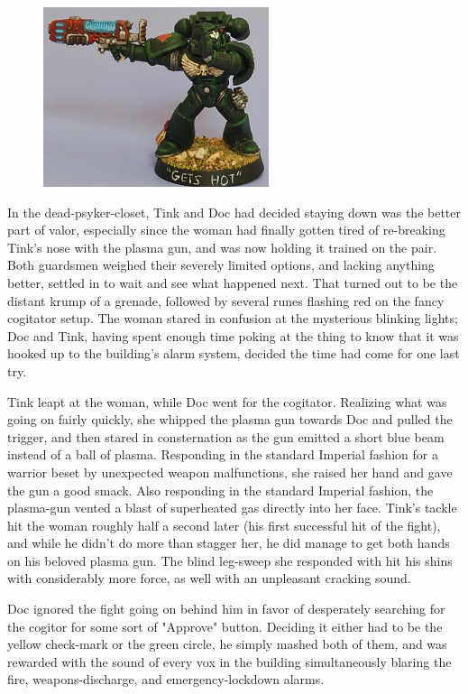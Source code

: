 \begin{figure}
	\begin{center}
		\includegraphics[width=\figwidth]{pics/21/93.png}
	\end{center}
\end{figure}
In the dead-psyker-closet, Tink and Doc had decided staying down was the better part of valor, especially since the woman had finally gotten tired of re-breaking Tink's nose with the plasma gun, and was now holding it trained on the pair. 
Both guardsmen weighed their severely limited options, and lacking anything better, settled in to wait and see what happened next. 
That turned out to be the distant krump of a grenade, followed by several runes flashing red on the fancy cogitator setup. 
The woman stared in confusion at the mysterious blinking lights; 
Doc and Tink, having spent enough time poking at the thing to know that it was hooked up to the building's alarm system, decided the time had come for one last try.

Tink leapt at the woman, while Doc went for the cogitator. 
Realizing what was going on fairly quickly, she whipped the plasma gun towards Doc and pulled the trigger, and then stared in consternation as the gun emitted a short blue beam instead of a ball of plasma. 
Responding in the standard Imperial fashion for a warrior beset by unexpected weapon malfunctions, she raised her hand and gave the gun a good smack. 
Also responding in the standard Imperial fashion, the plasma-gun vented a blast of superheated gas directly into her face. 
Tink's tackle hit the woman roughly half a second later (his first successful hit of the fight), and while he didn't do more than stagger her, he did manage to get both hands on his beloved plasma gun. 
The blind leg-sweep she responded with hit his shins with considerably more force, as well with an unpleasant cracking sound.

Doc ignored the fight going on behind him in favor of desperately searching for the cogitor for some sort of "Approve" button. 
Deciding it either had to be the yellow check-mark or the green circle, he simply mashed both of them, and was rewarded with the sound of every vox in the building simultaneously blaring the fire, weapons-discharge, and emergency-lockdown alarms.

